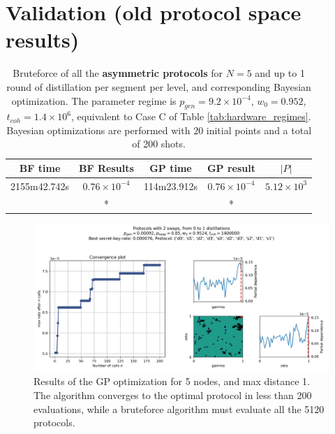 \documentclass{article}
\begin{document}
\clearpage
\section*{Validation (old protocol space results)}

\begin{table}[ht!]
  \centering
  \begin{tabular}{|c|c|c|c|c|}
      \hline
      BF time & BF Results & GP time & GP result & $|P|$ \\
      \hline
      2155m42.742s & $0.76 \times 10^{-4}$ & 114m23.912s & $0.76 \times 10^{-4}$ & $5.12 \times 10^{3}$ \\
      & *\footnotemark[1] & & *\footnotemark[1] & \\
      \hline
  \end{tabular}
  \caption{Bruteforce of all the \textbf{asymmetric protocols} for $N=5$ and up to 1 round of distillation per segment per level, and corresponding Bayesian optimization. The parameter regime is $p_{gen} = 9.2 \times 10^{-4}$, $w_0 = 0.952$, $t_{coh} = 1.4 \times 10^6$, equivalent to Case C of Table \ref{tab:hardware_regimes}. \\ Bayesian optimizations are performed with 20 initial points and a total of 200 shots.}
  \label{tab:validation_regimes}
\end{table}


\begin{figure}[ht!]
  \centering
  \includegraphics[width=\linewidth, trim=10 10 10 20, clip]{asymmetric/old_protocol_space/results_gp_tcoh1400000_pgen0.00092_pswap0.85_w00.9524_nodes5_maxdists1/0.9524_2_swaps_skopt_gp.png}
  \caption{Results of the GP optimization for 5 nodes, and max distance 1. The algorithm converges to the optimal protocol in less than 200 evaluations, while a bruteforce algorithm must evaluate all the 5120 protocols.}
  \label{fig:gp_results}
\end{figure}
\end{document}
